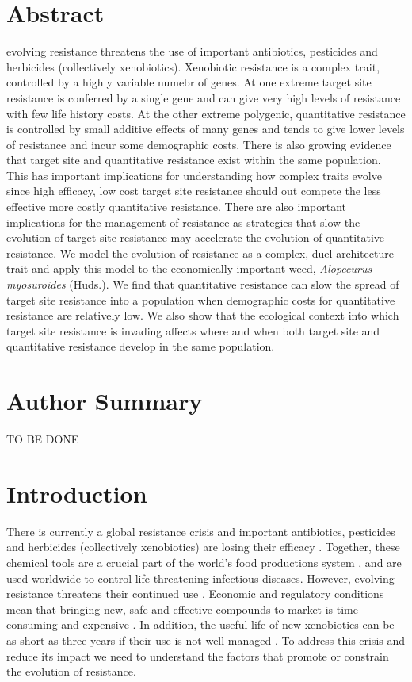 \documentclass[10pt,letterpaper]{article}
\begin{document}
\section*{Abstract}
evolving resistance threatens the use of important antibiotics, pesticides and herbicides (collectively xenobiotics). Xenobiotic resistance is a complex trait, controlled by a highly variable numebr of genes. At one extreme target site resistance is conferred by a single gene and can give very high levels of resistance with few life history costs. At the other extreme polygenic, quantitative resistance is controlled by small additive effects of many genes and tends to give lower levels of resistance and incur some demographic costs. There is also growing evidence that target site and quantitative resistance exist within the same population. This has important implications for understanding how complex traits evolve since high efficacy, low cost target site resistance should out compete the less effective more costly quantitative resistance. There are also important implications for the management of resistance as strategies that slow the evolution of target site resistance may accelerate the evolution of quantitative resistance. We model the evolution of resistance as a complex, duel architecture trait and apply this model to the economically important weed, \textit{Alopecurus myosuroides} (Huds.). We find that quantitative resistance can slow the spread of target site resistance into a population when demographic costs for quantitative resistance are relatively low. We also show that the ecological context into which target site resistance is invading affects where and when both target site and quantitative resistance develop in the same population.      

\section*{Author Summary}
TO BE DONE

\linenumbers

\section*{Introduction}
There is currently a global resistance crisis \cite{Serv2013, Ross2014} and important antibiotics, pesticides and herbicides (collectively xenobiotics) are losing their efficacy \cite{Palu2001}. Together, these chemical tools are a crucial part of the world's food productions system \cite{Duke2012}, and are used worldwide to control life threatening infectious diseases. However, evolving resistance threatens their continued use \cite{Barb2011, Nkya2013}. Economic and regulatory conditions mean that bringing new, safe and effective compounds to market is time consuming and expensive \cite{Duke2012}. In addition, the useful life of new xenobiotics can be as short as three years if their use is not well managed \cite{Palu2001, Duke2012}. To address this crisis and reduce its impact we need to understand the factors that promote or constrain the evolution of resistance. 
\end{document}
